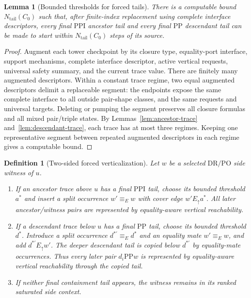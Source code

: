 \documentclass[11pt]{article}
\newtheorem{lemma}[theorem]{Lemma}
\newtheorem{definition}[theorem]{Definition}
\newcommand{\PP}{\mathrm{PP}}
\newcommand{\PPI}{\mathrm{PPI}}
\newcommand{\DR}{\mathrm{DR}}
\newcommand{\PO}{\mathrm{PO}}
\newcommand{\Eq}{\equiv_{\!E}}
\begin{document}
\begin{lemma}[Bounded thresholds for forced tails]
\label{lem:thresholds}
There is a computable bound $N_{\mathrm{tail}}(C_0)$ such that, after finite-index replacement using complete interface descriptors, every final $\PPI$ ancestor tail and every final $\PP$ descendant tail can be made to start within $N_{\mathrm{tail}}(C_0)$ steps of its source.
\end{lemma}

\begin{proof}
Augment each tower checkpoint by its closure type, equality-port interface, support mechanisms, complete interface descriptor, active vertical requests, universal safety summary, and the current trace value.  There are finitely many augmented descriptors.  Within a constant trace regime, two equal augmented descriptors delimit a replaceable segment: the endpoints expose the same complete interface to all outside pair-shape classes, and the same requests and universal targets.  Deleting or pumping the segment preserves all closure formulas and all mixed pair/triple states.  By Lemmas~\ref{lem:ancestor-trace} and~\ref{lem:descendant-trace}, each trace has at most three regimes.  Keeping one representative segment between repeated augmented descriptors in each regime gives a computable bound.
\end{proof}

\begin{definition}[Two-sided forced verticalization]
\label{def:two-sided-verticalization}
Let $w$ be a selected $\DR/\PO$ side witness of $u$.
\begin{enumerate}[label=(V\arabic*)]
\item If an ancestor trace above $u$ has a final $\PPI$ tail, choose its bounded threshold $a^*$ and insert a split occurrence $w'\Eq w$ with cover edge $w' E_\uparrow a^*$.  All later ancestor/witness pairs are represented by equality-aware vertical reachability.
\item If a descendant trace below $u$ has a final $\PP$ tail, choose its bounded threshold $d^*$.  Introduce a split occurrence $d^{*'}\Eq d^*$ and an equality mate $w'\Eq w$, and add $d^{*'}E_\uparrow w'$.  The deeper descendant tail is copied below $d^{*'}$ by equality-mate occurrences.  Thus every later pair $d_i\PP w$ is represented by equality-aware vertical reachability through the copied tail.
\item If neither final containment tail appears, the witness remains in its ranked saturated side context.
\end{enumerate}
\end{definition}
\end{document}
